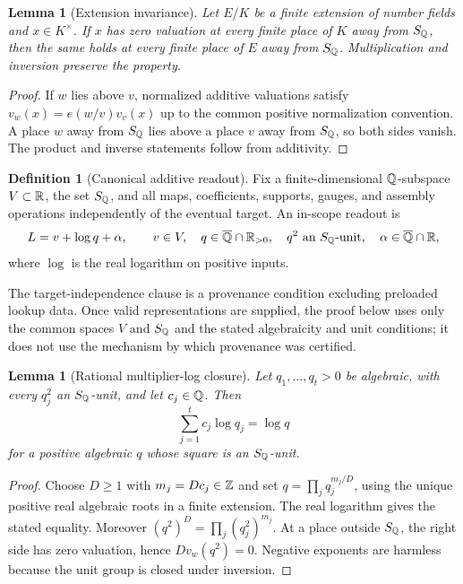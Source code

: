 \documentclass[11pt]{article}
\newtheorem{lemma}[theorem]{Lemma}
\theoremstyle{definition}
\newtheorem{definition}[theorem]{Definition}
\theoremstyle{remark}
\begin{document}
\begin{lemma}[Extension invariance]
\label{lem:extension}
Let $E/K$ be a finite extension of number fields and $x\in K^\times$.
If $x$ has zero valuation at every finite place of $K$ away from $S_{\mathbb Q}$, then
the same holds at every finite place of $E$ away from $S_{\mathbb Q}$.  Multiplication
and inversion preserve the property.
\end{lemma}

\begin{proof}
If $w$ lies above $v$, normalized additive valuations satisfy
$v_w(x)=e(w/v)v_v(x)$ up to the common positive normalization convention.
A place $w$ away from $S_{\mathbb Q}$ lies above a place $v$ away from $S_{\mathbb Q}$, so both
sides vanish.  The product and inverse statements follow from additivity.
\end{proof}

\begin{definition}[Canonical additive readout]
\label{def:readout}
Fix a finite-dimensional $\mathbb Q$-subspace $V\subset\mathbb R$, the set $S_{\mathbb Q}$, and all
maps, coefficients, supports, gauges, and assembly operations independently
of the eventual target.  An in-scope readout is
\begin{equation}
 L=v+\log q+\alpha,
 \qquad v\in V,\quad q\in\overline{\mathbb Q}\cap\mathbb R_{>0},\quad
 q^2\text{ an $S_{\mathbb Q}$-unit},\quad \alpha\in\overline{\mathbb Q}\cap\mathbb R,
 \label{eq:canonical}
\end{equation}
where $\log$ is the real logarithm on positive inputs.
\end{definition}

The target-independence clause is a provenance condition excluding preloaded
lookup data.  Once valid representations are supplied, the proof below uses
only the common spaces $V$ and $S_{\mathbb Q}$ and the stated algebraicity and unit
conditions; it does not use the mechanism by which provenance was certified.

\begin{lemma}[Rational multiplier-log closure]
\label{lem:rational-closure}
Let $q_1,\ldots,q_t>0$ be algebraic, with every $q_j^2$ an $S_{\mathbb Q}$-unit, and
let $c_j\in\mathbb Q$.  Then
\[
 \sum_{j=1}^t c_j\log q_j=\log q
\]
for a positive algebraic $q$ whose square is an $S_{\mathbb Q}$-unit.
\end{lemma}

\begin{proof}
Choose $D\geq1$ with $m_j=Dc_j\in\mathbb Z$ and set
$q=\prod_j q_j^{m_j/D}$, using the unique positive real algebraic roots in a
finite extension.  The real logarithm gives the stated equality.  Moreover
$(q^2)^D=\prod_j(q_j^2)^{m_j}$.  At a place outside $S_{\mathbb Q}$, the right side has
zero valuation, hence $D v_w(q^2)=0$.  Negative exponents are harmless because
the unit group is closed under inversion.
\end{proof}
\end{document}
